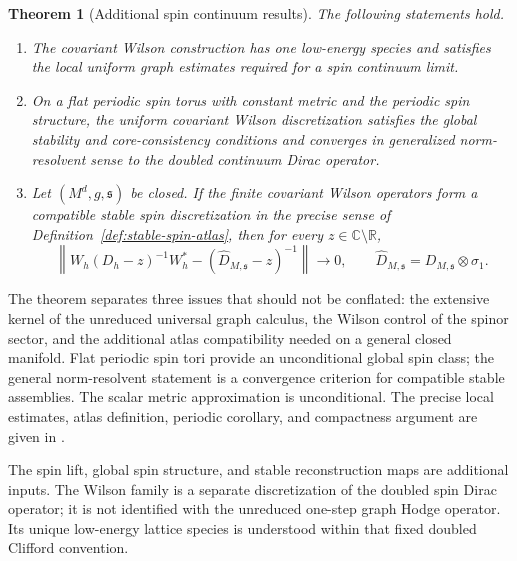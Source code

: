 \documentclass[11pt]{article}
\newtheorem{theorem}{Theorem}[section]
\theoremstyle{definition}
\theoremstyle{remark}
\theoremstyle{definition}
\theoremstyle{remark}
\newcommand{\R}{\mathbb R}
\newcommand{\C}{\mathbb C}
\begin{document}
\begin{theorem}[Additional spin continuum results]
\label{thm:summary-spin}
The following statements hold.
\begin{enumerate}[label=\textup{(\roman*)},leftmargin=2.8em]
\item The covariant Wilson construction has one low-energy species and satisfies the
local uniform graph estimates required for a spin continuum limit.
\item On a flat periodic spin torus with constant metric and the periodic spin
structure, the uniform covariant Wilson discretization satisfies the global
stability and core-consistency conditions and converges in generalized
norm-resolvent sense to the doubled continuum Dirac operator.
\item Let $(M^d,g,\mathfrak s)$ be closed.  If the finite covariant Wilson operators
form a compatible stable spin discretization in the precise sense of
Definition~\ref{def:stable-spin-atlas}, then for every $z\in\C\setminus\R$,
\begin{equation}
\left\|W_h(D_h-z)^{-1}W_h^*
-(\widehat D_{M,\mathfrak s}-z)^{-1}\right\|\longrightarrow0,
\qquad
\widehat D_{M,\mathfrak s}=D_{M,\mathfrak s}\otimes\sigma_1.
\label{eq:summary-spin-resolvent}
\end{equation}
\end{enumerate}
\end{theorem}

The theorem separates three issues that should not be conflated: the extensive
kernel of the unreduced universal graph calculus, the Wilson control of
the spinor sector, and the additional atlas compatibility needed on a general
closed manifold.  Flat periodic spin tori provide an unconditional global spin
class; the general norm-resolvent statement is a convergence criterion for
compatible stable assemblies.  The scalar metric approximation is unconditional.
The precise local estimates, atlas definition, periodic corollary, and compactness
argument are given in .



The spin lift, global spin structure, and stable reconstruction maps are
additional inputs.  The Wilson family is a separate discretization of the doubled
spin Dirac operator; it is not identified with the unreduced one-step graph Hodge
operator.  Its unique low-energy lattice species is understood within that fixed
doubled Clifford convention.
\end{document}
